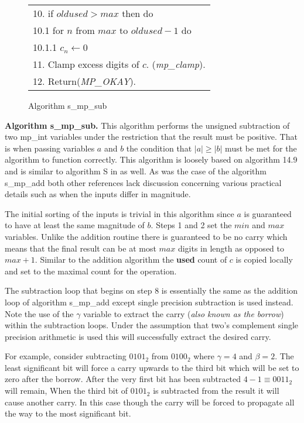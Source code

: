\documentclass[b5paper]{book}
\begin{document}
\begin{figure}[!here]
\begin{center}
\begin{small}
\begin{tabular}{l}
10. if $oldused > max$ then do \\
\hspace{3mm}10.1  for $n$ from $max$ to $oldused - 1$ do \\
\hspace{6mm}10.1.1  $c_n \leftarrow 0$ \\
11. Clamp excess digits of $c$.  (\textit{mp\_clamp}). \\
12. Return(\textit{MP\_OKAY}). \\
\hline
\end{tabular}
\end{small}
\end{center}
\caption{Algorithm s\_mp\_sub}
\end{figure}

\textbf{Algorithm s\_mp\_sub.}
This algorithm performs the unsigned subtraction of two mp\_int variables under the restriction that the result must be positive.  That is when
passing variables $a$ and $b$ the condition that $\vert a \vert \ge \vert b \vert$ must be met for the algorithm to function correctly.  This
algorithm is loosely based on algorithm 14.9 \cite[pp. 595]{HAC} and is similar to algorithm S in \cite[pp. 267]{TAOCPV2} as well.  As was the case
of the algorithm s\_mp\_add both other references lack discussion concerning various practical details such as when the inputs differ in magnitude.

The initial sorting of the inputs is trivial in this algorithm since $a$ is guaranteed to have at least the same magnitude of $b$.  Steps 1 and 2 
set the $min$ and $max$ variables.  Unlike the addition routine there is guaranteed to be no carry which means that the final result can be at 
most $max$ digits in length as opposed to $max + 1$.  Similar to the addition algorithm the \textbf{used} count of $c$ is copied locally and 
set to the maximal count for the operation.

The subtraction loop that begins on step 8 is essentially the same as the addition loop of algorithm s\_mp\_add except single precision 
subtraction is used instead.  Note the use of the $\gamma$ variable to extract the carry (\textit{also known as the borrow}) within the subtraction 
loops.  Under the assumption that two's complement single precision arithmetic is used this will successfully extract the desired carry.  

For example, consider subtracting $0101_2$ from $0100_2$ where $\gamma = 4$ and $\beta = 2$.  The least significant bit will force a carry upwards to 
the third bit which will be set to zero after the borrow.  After the very first bit has been subtracted $4 - 1 \equiv 0011_2$ will remain,  When the 
third bit of $0101_2$ is subtracted from the result it will cause another carry.  In this case though the carry will be forced to propagate all the 
way to the most significant bit.  
\end{document}
